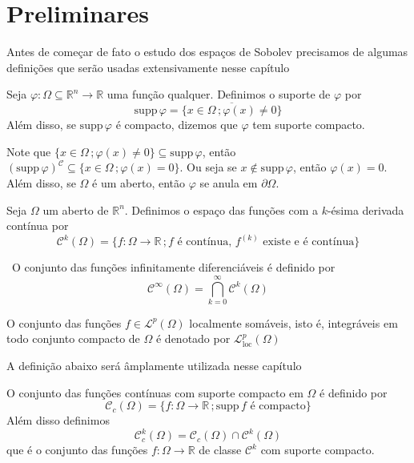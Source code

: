 \documentclass[a4paper, 11pt]{book}
\theoremstyle{definition}
\newcommand{\obs}{\noindent{\textbf{\textcolor{black}{\sffamily Observação:}}}~}
\newcommand{\bR}{\mathbb{R}}
\newcommand{\cC}{\mathcal{C}}
\newcommand{\cL}{\mathcal{L}}
\newcommand{\supp}{\mathrm{supp}\,}
\begin{document}
\section{Preliminares}

Antes de começar de fato o estudo dos espaços de Sobolev precisamos de algumas definições que serão usadas extensivamente nesse capítulo

\begin{dbox} \label{def:suporte}
    Seja $\varphi : \Omega \subseteq \bR ^n \to \bR$ uma função qualquer. Definimos o suporte de $\varphi$ por
    \[
        \supp \varphi = \overline{\{x \in \Omega \,; \varphi(x) \neq 0\}}
    \]
    Além disso, se $\supp\varphi$ é compacto, dizemos que $\varphi$ tem suporte compacto.
\end{dbox}

Note que $\{x \in \Omega \,; \varphi(x) \neq 0\} \subseteq \supp \varphi$, então $(\supp \varphi)^\cC \subseteq \{x \in \Omega \,; \varphi(x) = 0\}$. Ou seja se $x \not\in \supp \varphi$, então $\varphi(x) = 0$.
Além disso, se $\Omega$ é um aberto, então $\varphi$ se anula em $\partial\Omega$.

\begin{dbox}
    Seja $\Omega$ um aberto de $\bR^n$. Definimos o espaço das funções com a $k$-ésima derivada contínua por
    \[
        \cC^k(\Omega) = \{f : \Omega \to \bR \,; f \text{ é contínua, } f^{(k)} \text{ existe e é contínua}\}
    \]
\end{dbox}

\obs O conjunto das funções infinitamente diferenciáveis é definido por
\[
    \cC^\infty(\Omega) = \bigcap_{k=0}^\infty \cC^k(\Omega)
\]

\begin{dbox}
    O conjunto das funções $f \in \cL^p(\Omega)$ localmente somáveis, isto é, integráveis em todo conjunto compacto de $\Omega$ é denotado por $\cL^p_{\mathrm{loc}}(\Omega)$ 
\end{dbox}

A definição abaixo será âmplamente utilizada nesse capítulo

\begin{dbox}
    O conjunto das funções contínuas com suporte compacto em $\Omega$ é definido por
    \[
        \cC_c(\Omega) = \{f : \Omega \to \bR \,; \supp f \text{ é compacto}\}
    \]
    Além disso definimos
    \[
        \cC^k_c(\Omega) = \cC_c(\Omega) \cap \cC^k(\Omega)
    \]
    que é o conjunto das funções $f : \Omega \to \bR$ de classe $\cC^k$ com suporte compacto.
\end{dbox}
\end{document}
